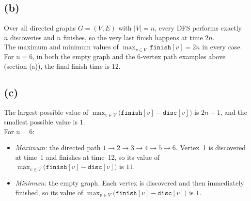 \documentclass[11pt]{article}
\begin{document}
    \subsection*{(b)}
    Over all directed graphs $G=(V,E)$ with $|V|=n$, every DFS performs exactly $n$ discoveries and $n$ finishes, so the very last finish happens at time $2n$.\\
    The maximum and minimum values of $\max_{v\in V}\,\texttt{finish}[v] = 2n$ in every case.  \\
    For $n=6$, in both the empty graph and the 6‑vertex path examples above (section (a)), the final finish time is $12$.
    
    \subsection*{(c)}
    The largest possible value of $\max_{v\in V}\bigl(\texttt{finish}[v]-\texttt{disc}[v]\bigr)$ is $2n-1$, and the smallest possible value is $1$.\\ 
    For $n=6$:
    \begin{itemize}
      \item \emph{Maximum:} the directed path $1\to2\to3\to4\to5\to6$.  Vertex 1 is discovered at time 1 and finishes at time 12, so its value of $\max_{v\in V}\bigl(\texttt{finish}[v]-\texttt{disc}[v]\bigr)$ is $11$.
      \item \emph{Minimum:} the empty graph.  Each vertex is discovered and then immediately finished, so its value of $\max_{v\in V}\bigl(\texttt{finish}[v]-\texttt{disc}[v]\bigr)$ is $1$.
    \end{itemize}
\end{document}
